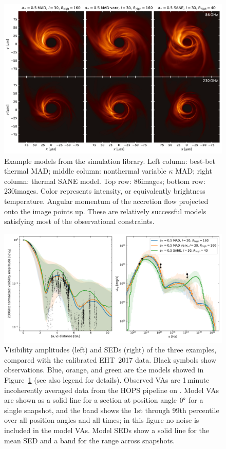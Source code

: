 \begin{figure}
  \centering
  \includegraphics[width=\textwidth]{figures/example_imgs.pdf}
  \caption{Example models from the simulation library.  Left column: best-bet thermal MAD; middle column: nonthermal variable $\kappa$ MAD; right column: thermal SANE model.  Top row: 86\GHz images; bottom row: 230\GHz images.  Color represents intensity, or equivalently brightness temperature.  Angular momentum of the accretion flow projected onto the image points up.  These are relatively successful models satisfying most of the observational  constraints.}
  \label{fig:example_imgs}
\end{figure}

\begin{figure}
  \centering
  \includegraphics[width=\textwidth]{figures/example_vas_seds.pdf}
  \caption{Visibility amplitudes (left) and SEDs (right) of the three examples, compared with the calibrated EHT~2017 data.  Black symbols show observations.  Blue, orange, and green are the models showed in Figure~\ref{fig:example_imgs} (see also legend for details).  Observed VAs are 1\,minute incoherently averaged data from the HOPS pipeline on \aprilvii.  Model VAs are shown as a solid line for a section at position angle $0\degree$ for a single snapshot, and the band shows the 1st through 99th percentile over all position angles and all times; in this figure no noise is included in the model VAs.  Model SEDs show a solid line for the mean SED and a band for the range across snapshots.}
  \label{fig:example_vas_seds}
\end{figure}

